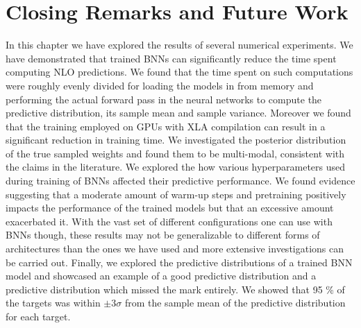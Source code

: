 
\section*{Closing Remarks and Future Work}
In this chapter we have explored the results of several numerical experiments. We have demonstrated that trained BNNs can significantly reduce the time spent computing NLO predictions. We found that the time spent on such computations were roughly evenly divided for loading the models in from memory and performing the actual forward pass in the neural networks to compute the predictive distribution, its sample mean and sample variance. Moreover we found that the training employed on GPUs with XLA compilation can result in a significant reduction in training time.
We investigated the posterior distribution of the true sampled weights and found them to be multi-modal, consistent with the claims in the literature. We explored the how various hyperparameters used during training of BNNs affected their predictive performance. We found evidence suggesting that a moderate amount of warm-up steps and pretraining positively impacts the performance of the trained models but that an excessive amount exacerbated it. With the vast set of different configurations one can use with BNNs though, these results may not be generalizable to different forms of architectures than the ones we have used and more extensive investigations can be carried out. Finally, we explored the predictive distributions of a trained BNN model and showcased an example of a good predictive distribution and a predictive distribution which missed the mark entirely. We showed that 95 \% of the targets was within $\pm 3 \sigma$ from the sample mean of the predictive distribution for each target. 


